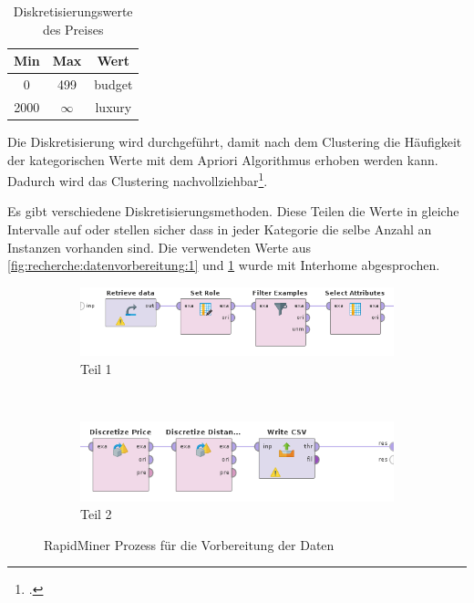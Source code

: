 \begin{table}[h] 
	\caption{Diskretisierungswerte des Preises}
	\centering
	\label{fig:recherche:datenvorbereitung:2}
	\begin{tabular}{ | c | c | c |} 
		\hline 
		\rowcolor{tableheadcolor}
		\bfseries Min & \bfseries Max & \bfseries Wert \\ \hline 
		0 & 499 & budget \\ \hline 
		2000 & $\infty$ & luxury \\ \hline 
	\end{tabular}
\end{table}

Die Diskretisierung wird durchgeführt, damit nach dem Clustering die Häufigkeit der kategorischen Werte mit dem Apriori Algorithmus erhoben werden kann. Dadurch wird das Clustering nachvollziehbar\footcite{data_mining_concepts_and_techniques}. 

Es gibt verschiedene Diskretisierungsmethoden. Diese Teilen die Werte in gleiche Intervalle auf oder stellen sicher dass in jeder Kategorie die selbe Anzahl an Instanzen vorhanden sind.
Die verwendeten Werte aus \cref{fig:recherche:datenvorbereitung:1} und \cref{fig:recherche:datenvorbereitung:2} wurde mit Interhome abgesprochen. 


\begin{figure}[htb]
	\begin{subfigure}[t]{0.8\linewidth}
		\centering
		\includegraphics[width=1\linewidth]{images/rapidminer-process-1.png}
		\caption{Teil 1}
		\label{fig:recherche:datenvorbereitung:3:1}
	\end{subfigure} \\
	\begin{subfigure}[t]{0.8\linewidth}
		\centering
		\includegraphics[width=1\linewidth]{images/rapidminer-process-2.png}
		\caption{Teil 2}
		\label{fig:recherche:datenvorbereitung:3:2}
	\end{subfigure}
	\caption{RapidMiner Prozess für die Vorbereitung der Daten}
	\label{fig:recherche:datenvorbereitung:3}
\end{figure}

